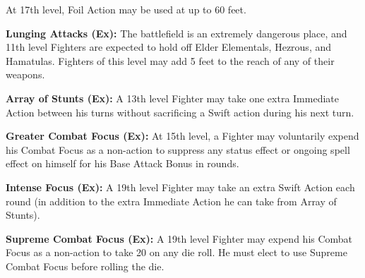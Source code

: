 At 17th level, Foil Action may be used at up to 60 feet.

\textbf{Lunging Attacks (Ex):} The battlefield is an extremely dangerous place, and 11th level Fighters are expected to hold off Elder Elementals, Hezrous, and Hamatulas. Fighters of this level may add 5 feet to the reach of any of their weapons.

\textbf{Array of Stunts (Ex):} A 13th level Fighter may take one extra Immediate Action between his turns without sacrificing a Swift action during his next turn.

\textbf{Greater Combat Focus (Ex):} At 15th level, a Fighter may voluntarily expend his Combat Focus as a non-action to suppress any status effect or ongoing spell effect on himself for his Base Attack Bonus in rounds.

\textbf{Intense Focus (Ex):} A 19th level Fighter may take an extra Swift Action each round (in addition to the extra Immediate Action he can take from Array of Stunts).

\textbf{Supreme Combat Focus (Ex):} A 19th level Fighter may expend his Combat Focus as a non-action to take 20 on any die roll. He must elect to use Supreme Combat Focus before rolling the die.
